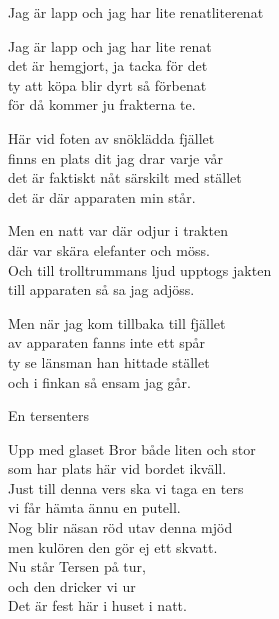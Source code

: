\begin{song}{Jag är lapp och jag har lite renat}{literenat}
\begin{vers}
Jag är lapp och jag har lite renat\\
det är hemgjort, ja tacka för det\\
ty att köpa blir dyrt så förbenat\\
för då kommer ju frakterna te.\\
\end{vers}
\begin{vers}
Här vid foten av snöklädda fjället\\
finns en plats dit jag drar varje vår\\
det är faktiskt nåt särskilt med stället\\
det är där apparaten min står.\\
\end{vers}
\begin{vers}
Men en natt var där odjur i trakten\\
där var skära elefanter och möss.\\
Och till trolltrummans ljud upptogs jakten\\
till apparaten så sa jag adjöss.\\
\end{vers}
\begin{vers}
Men när jag kom tillbaka till fjället\\
av apparaten fanns inte ett spår\\
ty se länsman han hittade stället\\
och i finkan så ensam jag går.\\
\end{vers}
\end{song}

\newpage

\begin{song}{En ters}{enters}
\begin{vers}
Upp med glaset Bror både liten och stor\\
som har plats här vid bordet ikväll.\\
Just till denna vers ska vi taga en ters\\
vi får hämta ännu en putell.\\
Nog blir näsan röd utav denna mjöd\\
men kulören den gör ej ett skvatt.\\
Nu står Tersen på tur,\\
och den dricker vi ur\\
Det är fest här i huset i natt.\\
\end{vers}
\end{song}

